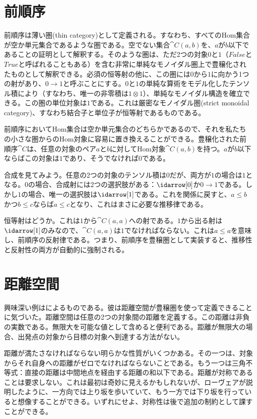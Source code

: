 \section{前順序}

前順序は薄い圏(thin category)として定義される。すなわち、すべてのHom集合が空か単元集合であるような圏である。空でない集合$\cat{C}(a, b)$を、$a$が$b$以下であることの証明として解釈する。そのような圏は、ただ2つの対象$0$と$1$（$\mathit{False}$と$\mathit{True}$と呼ばれることもある）を含む非常に単純なモノイダル圏上で豊穣化されたものとして解釈できる。必須の恒等射の他に、この圏には$0$から$1$に向かう1つの射があり、$0 \to 1$と呼ぶことにする。$0$と$1$の単純な算術をモデル化したテンソル積により（すなわち、唯一の非零積は$1 \otimes 1$）、単純なモノイダル構造を確立できる。この圏の単位対象は$1$である。これは厳密なモノイダル圏(strict monoidal category)、すなわち結合子と単位子が恒等射であるものである。

前順序においてHom集合は空か単元集合のどちらかであるので、それを私たちの小さな圏からのHom対象に容易に置き換えることができる。豊穣化された前順序$\cat{C}$は、任意の対象のペア$a$と$b$に対してHom対象$\cat{C}(a, b)$を持つ。$a$が$b$以下ならばこの対象は$1$であり、そうでなければ$0$である。

合成を見てみよう。任意の2つの対象のテンソル積は$0$だが、両方が$1$の場合は$1$となる。$0$の場合、合成射には2つの選択肢がある：$\idarrow[0]$か$0 \to 1$である。しかし$1$の場合、唯一の選択肢は$\idarrow[1]$である。これを関係に戻すと、$a \leqslant b$かつ$b \leqslant c$ならば$a \leqslant c$となり、これはまさに必要な推移律である。

恒等射はどうか。これは$1$から$\cat{C}(a, a)$への射である。$1$から出る射は$\idarrow[1]$のみなので、$\cat{C}(a, a)$は$1$でなければならない。これは$a \leqslant a$を意味し、前順序の反射律である。つまり、前順序を豊穣圏として実装すると、推移性と反射性の両方が自動的に強制される。

\section{距離空間}

興味深い例はによるものである。彼は距離空間が豊穣圏を使って定義できることに気づいた。距離空間は任意の2つの対象間の距離を定義する。この距離は非負の実数である。無限大を可能な値として含めると便利である。距離が無限大の場合、出発点の対象から目標の対象へ到達する方法がない。

距離が満たさなければならない明らかな性質がいくつかある。その一つは、対象からそれ自身への距離がゼロでなければならないことである。もう一つは三角不等式：直接の距離は中間地点を経由する距離の和以下である。距離が対称であることは要求しない。これは最初は奇妙に見えるかもしれないが、ローヴェアが説明したように、一方向では上り坂を歩いていて、もう一方では下り坂を行っていると想像することができる。いずれにせよ、対称性は後で追加の制約として課すことができる。

